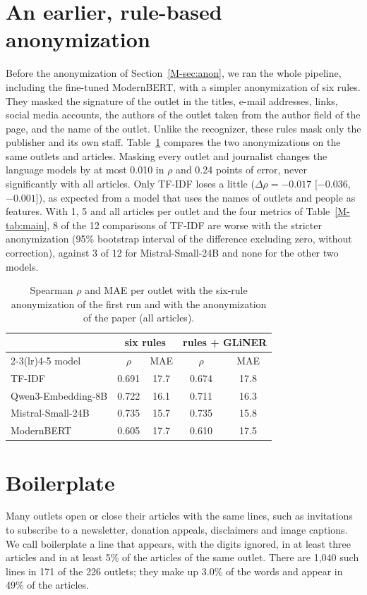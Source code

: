 \documentclass[11pt,a4paper]{article}
\begin{document}
\section{An earlier, rule-based anonymization}\label{app:anon}
Before the anonymization of Section~\ref{M-sec:anon}, we ran the whole pipeline, including the fine-tuned ModernBERT,
with a simpler anonymization of six rules. They masked the signature of the outlet in the titles, e-mail addresses,
links, social media accounts, the authors of the outlet taken from the author field of the page, and the name of the
outlet. Unlike the recognizer, these rules mask only the publisher and its own staff. Table~\ref{tab:anon} compares the
two anonymizations on the same outlets and articles. Masking every outlet and journalist changes the language models by
at most 0.010 in $\rho$ and 0.24 points of error, never significantly with all articles. Only TF-IDF loses a little
($\Delta\rho = -0.017$ [$-0.036$, $-0.001$]), as expected from a model that uses the names of outlets and people as
features. With 1, 5 and all articles per outlet and the four metrics of Table~\ref{M-tab:main}, 8 of the 12 comparisons
of TF-IDF are worse with the stricter anonymization (95\% bootstrap interval of the difference excluding zero, without
correction), against 3 of 12 for Mistral-Small-24B and none for the other two models.

\begin{table}[h]
\centering
\caption{Spearman $\rho$ and MAE per outlet with the six-rule anonymization of the first run and with the
anonymization of the paper (all articles).}\label{tab:anon}
\begin{tabular}{lcccc}
\toprule
& \multicolumn{2}{c}{six rules} & \multicolumn{2}{c}{rules + GLiNER} \\
\cmidrule(lr){2-3}\cmidrule(lr){4-5}
model & $\rho$ & MAE & $\rho$ & MAE \\
\midrule
TF-IDF & 0.691 & 17.7 & 0.674 & 17.8 \\
Qwen3-Embedding-8B & 0.722 & 16.1 & 0.711 & 16.3 \\
Mistral-Small-24B & 0.735 & 15.7 & 0.735 & 15.8 \\
ModernBERT & 0.605 & 17.7 & 0.610 & 17.5 \\
\bottomrule
\end{tabular}
\end{table}

\section{Boilerplate}\label{app:reading}
Many outlets open or close their articles with the same lines, such as invitations to subscribe to a newsletter,
donation appeals, disclaimers and image captions. We call boilerplate a line that appears, with the digits ignored, in
at least three articles and in at least 5\% of the articles of the same outlet. There are 1,040 such lines in 171 of the
226 outlets; they make up 3.0\% of the words and appear in 49\% of the articles.
\end{document}
